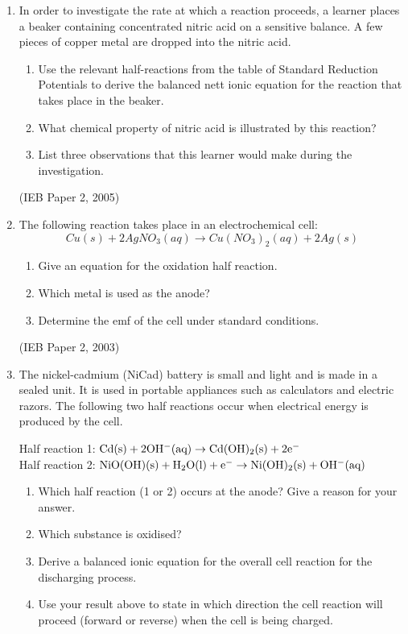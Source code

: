 \begin{eocexercises}{}
\begin{enumerate}
\begin{enumerate}
	\end{enumerate}


\item{In order to investigate the rate at which a reaction proceeds, a learner places a beaker containing concentrated nitric acid on a sensitive balance. A few pieces of copper metal are dropped into the nitric acid. }
	\begin{enumerate}
	\item{Use the relevant half-reactions from the table of Standard Reduction Potentials to derive the balanced nett ionic equation for the reaction that takes place in the beaker.}
	\item{What chemical property of nitric acid is illustrated by this reaction?}
	\item{List three observations that this learner would make during the investigation.}
	\end{enumerate}
(IEB Paper 2, 2005)
\item{The following reaction takes place in an electrochemical cell:
\begin{equation*}
Cu(s) + 2AgNO_{3}(aq) \rightarrow Cu(NO_{3})_{2}(aq) + 2Ag(s)
\end{equation*}

	\begin{enumerate}
	\item{Give an equation for the oxidation half reaction.}
	\item{Which metal is used as the anode?}
	\item{Determine the emf of the cell under standard conditions.}
	\end{enumerate}
}
(IEB Paper 2, 2003)
\item{The nickel-cadmium (NiCad) battery is small and light and is made in a sealed unit. It is used in portable appliances such as calculators and electric razors. The following two half reactions occur when electrical energy is produced by the cell.}

Half reaction 1: $\rm{Cd(s) + 2OH^{-}(aq) \rightarrow Cd(OH)_{2}(s) + 2e^{-}}$\\

Half reaction 2: $\rm{NiO(OH)(s) + H_{2}O(l) + e^{-} \rightarrow Ni(OH)_{2}(s) + OH^{-}(aq)}$

	\begin{enumerate}
	\item{Which half reaction (1 or 2) occurs at the anode? Give a reason for your answer.}
	\item{Which substance is oxidised?}
	\item{Derive a balanced ionic equation for the overall cell reaction for the discharging process.}
	\item{Use your result above to state in which direction the cell reaction will proceed (forward or reverse) when the cell is being charged.}
	\end{enumerate}


\end{enumerate}
\end{eocexercises}
